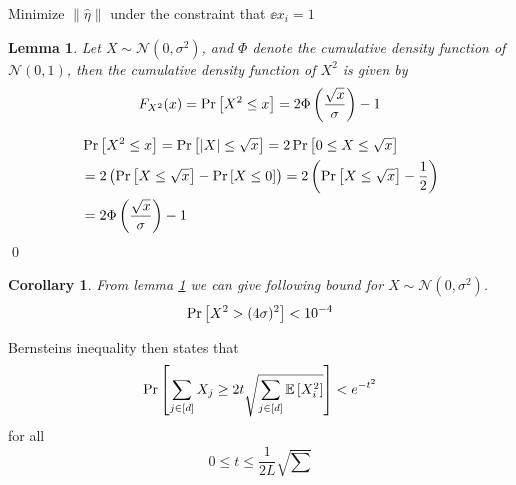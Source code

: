 \documentclass[a4paper,12pt]{article}
\renewenvironment{proof}{{\textit{Proof} \\}}{\qed}
\newtheorem{corollary}{Corollary}[section]
\newtheorem{lemma}{Lemma}[section]
\begin{document}
Minimize $\| \hat{\eta} \|$ under the constraint that $\ee{x_i} = 1$  

\begin{lemma}
\label{lem:chibound}
Let $X \sim \mathcal{N}(0,\sigma^2)$, and $\Phi$ denote the 
cumulative density function of $\mathcal{N}(0,1)$, then the 
cumulative density function of $X^2$ is given by
\[
    F_{X^2}(x) = \Pr\left [X^2 \le x \right] = 2\Phi \left (\frac{\sqrt{x}}{\sigma}\right) - 1
\]
\end{lemma}
\begin{proof}
\begin{align*}
    &\Pr\left [X^2 \le x \right] =
    \Pr\left [ |X| \le \sqrt{x} \right] =
    2 \Pr\left [0 \le X \le \sqrt{x} \right]  \\
    & =2  \left (\Pr\left [X \le \sqrt{x} \right] - \Pr\left [X \le 0 \right]\right) =
    2 \left (\Pr\left [X \le \sqrt{x} \right] - \frac{1}{2}\right)  \\
    &= 2 \Phi \left (\frac{\sqrt{x}}{\sigma}\right) - 1 
\end{align*}
\end{proof}
\begin{corollary}
From lemma \ref{lem:chibound} we can give following bound for $X \sim \mathcal{N}(0,\sigma^2)$.
\[
    \Pr\left [X^2 > (4\sigma)^2 \right] < 10^{-4}
\]
\end{corollary}


\newpage





Bernsteins inequality then states that
\[
    \Pr\left [\sum_{j \in [d]} X_j \ge 2 t \sqrt{ \sum_{j \in [d]} \mathbb{E} \left [ X_i^2  \right]} \right] < e^{-t^2}
\]
for all 
\[
    0 \le t \le \frac{1}{2L} \sqrt{\sum}
\]
\end{document}
